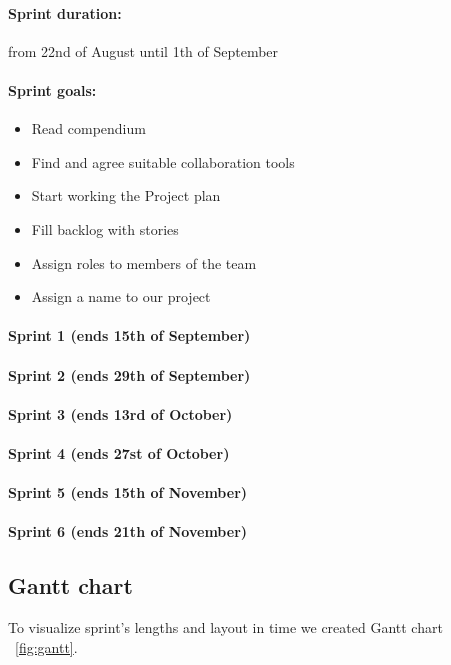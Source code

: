 \documentclass{article}
\begin{document}
\paragraph{Sprint duration:} from 22nd of August until 1th of September
\paragraph{Sprint goals:}
\begin{itemize}
    \item Read compendium
    \item Find and agree suitable collaboration tools
    \item Start working the Project plan
    \item Fill backlog with stories
    \item Assign roles to members of the team
    \item Assign a name to our project
\end{itemize}



\paragraph{Sprint 1 (ends 15th of September)}
\paragraph{Sprint 2 (ends 29th of September)}
\paragraph{Sprint 3 (ends 13rd of October)}
\paragraph{Sprint 4 (ends 27st of October)}
\paragraph{Sprint 5 (ends 15th of November)}
\paragraph{Sprint 6 (ends 21th of November)}
\subsection{Gantt chart}
To visualize sprint's lengths and layout in time we created Gantt chart ~\ref{fig:gantt}.
\end{document}
